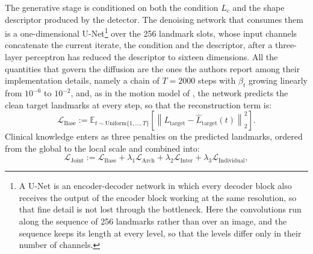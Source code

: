 \documentclass[10pt,a4paper]{article}
\begin{document}
The generative stage is conditioned on both the condition $L_c$ and the shape descriptor produced by the detector. The denoising network that consumes them is a one-dimensional U-Net\footnote{A U-Net is an encoder-decoder network in which every decoder block also receives the output of the encoder block working at the same resolution, so that fine detail is not lost through the bottleneck. Here the convolutions run along the sequence of 256 landmarks rather than over an image, and the sequence keeps its length at every level, so that the levels differ only in their number of channels.} over the 256 landmark slots, whose input channels concatenate the current iterate, the condition and the descriptor, after a three-layer perceptron has reduced the descriptor to sixteen dimensions. All the quantities that govern the diffusion are the ones the authors report among their implementation details, namely a chain of $T = 2000$ steps with $\beta_t$ growing linearly from $10^{-6}$ to $10^{-2}$, and, as in the motion model of \citeauthor{tevet2023mdm}, the network predicts the clean target landmarks at every step, so that the reconstruction term is:
\begin{equation}
\mathcal{L}_{\text{Base}} := \mathbb{E}_{t\sim\mathrm{Uniform}\{1,\ldots,T\}}\left[\left\lVert L_{\text{target}} - \hat{L}_{\text{target}}(t)\right\rVert_2^2\right].
\label{eq:base}
\end{equation}
Clinical knowledge enters as three penalties on the predicted landmarks, ordered from the global to the local scale and combined into:
\begin{equation}
\mathcal{L}_{\text{Joint}} := \mathcal{L}_{\text{Base}} + \lambda_1 \mathcal{L}_{\text{Arch}} + \lambda_2 \mathcal{L}_{\text{Inter}} + \lambda_3 \mathcal{L}_{\text{Individual}},
\end{equation}
\end{document}
